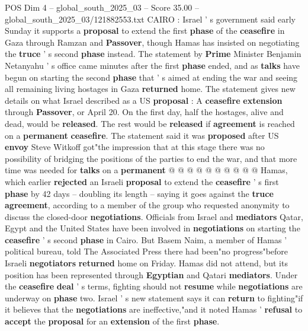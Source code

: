 \begin{textsample}{POS Dim 4 – global\_south\_2025\_03 – Score 35.00 – global\_south\_2025\_03/121882553.txt}  \label{ex:f4_pos_031}
CAIRO : Israel ' s government said early Sunday it supports a \textbf{proposal} to extend the first \textbf{phase} of the \textbf{ceasefire} in Gaza through Ramzan and \textbf{Passover}, though Hamas has insisted on negotiating the \textbf{truce} ' s second \textbf{phase} instead.
The statement by \textbf{Prime} Minister Benjamin Netanyahu ' s office came minutes after the first \textbf{phase} ended, and as \textbf{talks} have begun on starting the second \textbf{phase} that ' s aimed at ending the war and seeing all remaining living hostages in Gaza \textbf{returned} home.
The statement gives new details on what Israel described as a US \textbf{proposal} : A \textbf{ceasefire} \textbf{extension} through \textbf{Passover}, or April 20.
On the first day, half the hostages, alive and dead, would be \textbf{released}.
The rest would be \textbf{released} if \textbf{agreement} is reached on a \textbf{permanent} \textbf{ceasefire}.
The statement said it was \textbf{proposed} after US \textbf{envoy} Steve Witkoff got"the impression that at this stage there was no possibility of bridging the positions of the parties to end the war, and that more time was needed for \textbf{talks} on a \textbf{permanent} @ @ @ @ @ @ @ @ @ @ Hamas, which earlier \textbf{rejected} an Israeli \textbf{proposal} to extend the \textbf{ceasefire} ' s first \textbf{phase} by 42 days -- doubling its length -- saying it goes against the \textbf{truce} \textbf{agreement}, according to a member of the group who requested anonymity to discuss the closed-door \textbf{negotiations}.
Officials from Israel and \textbf{mediators} Qatar, Egypt and the United States have been involved in \textbf{negotiations} on starting the \textbf{ceasefire} ' s second \textbf{phase} in Cairo.
But Basem Naim, a member of Hamas ' political bureau, told The Associated Press there had been"no progress"before Israeli \textbf{negotiators} \textbf{returned} home on Friday.
Hamas did not attend, but its position has been represented through \textbf{Egyptian} and Qatari \textbf{mediators}.
Under the \textbf{ceasefire} \textbf{deal} ' s terms, fighting should not \textbf{resume} while \textbf{negotiations} are underway on \textbf{phase} two.
Israel ' s new statement says it can \textbf{return} to fighting"if it believes that the \textbf{negotiations} are ineffective,"and it noted Hamas ' \textbf{refusal} to \textbf{accept} the \textbf{proposal} for an \textbf{extension} of the first \textbf{phase}.

\end{textsample}
